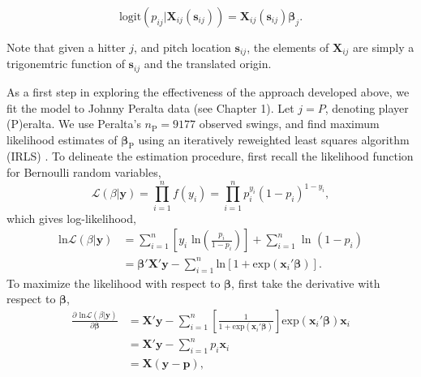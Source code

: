 \begin{equation}
\text{logit}(p_{ij}|\pmb{X}_{ij}(\pmb{s}_{ij})) = \pmb{X}_{ij}(\pmb{s}_{ij}) \pmb{\beta}_{j}.
\end{equation}


Note that given a hitter $j$, and pitch location $\pmb{s}_{ij}$, the elements of $\pmb{X}_{ij}$ are simply a trigonemtric function of $\pmb{s}_{ij}$ and the translated origin.

As a first step in exploring the effectiveness of the approach developed above, we fit the model to Johnny Peralta data (see Chapter 1). Let $j = P$, denoting player (P)eralta. We use Peralta's $n_{\text{P}} = 9177$ observed swings, and find maximum likelihood estimates of $\pmb{\beta}_{\text{P}}$ using an iteratively reweighted least squares algorithm (IRLS) \citep{Myers2012}. To delineate the estimation procedure, first recall the likelihood function for Bernoulli random variables,
\begin{equation}
\mathcal{L}(\beta|\pmb{y}) = \prod_{i=1}^{n} f(y_{i}) =  \prod_{i=1}^{n} p_{i}^{y_{i}}(1-p_{i})^{1-y_{i}},
\end{equation}
which gives log-likelihood, 
\begin{align}
\text{ln} \mathcal{L}(\beta|\pmb{y}) &= \sum_{i=1}^{n} \left[ y_{i} \text{ ln}\left(\frac{p_{i}}{1-p_{i}}\right) \right] + \sum_{i=1}^{n} \text{ ln }(1-p_{i}) \\
&= \pmb{\beta}'\pmb{X}'\pmb{y} - \sum_{i=1}^{n} \text{ln}[1 + \text{exp}(\pmb{x}_{i}'\pmb{\beta})].
\end{align}
To maximize the likelihood with respect to $\pmb{\beta}$, first take the derivative with respect to $\pmb{\beta}$,
\begin{align}
\frac{\partial \text{ ln} \mathcal{L}(\beta|\pmb{y})}{\partial \pmb{\beta}} &= \pmb{X}'\pmb{y} - \sum_{i=1}^{n}  \left[ \frac{1}{1 + \text{exp}(\pmb{x}_{i}'\pmb{\beta})} \right] \text{exp}  (\pmb{x}_{i}' \pmb{\beta}) \pmb{x}_{i} \\
&= \pmb{X}'\pmb{y} - \sum_{i=1}^{n} p_{i} \pmb{x}_{i} \\
&= \pmb{X}(\pmb{y} - \pmb{p}),
\end{align}
